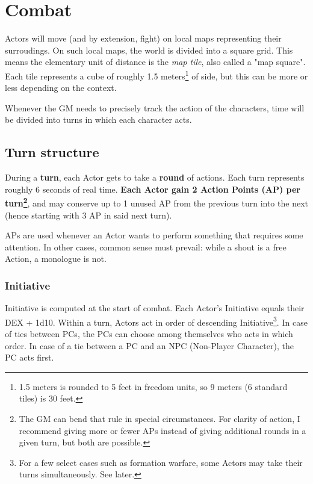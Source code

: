 \chapter{Combat}

Actors will move (and by extension, fight) on local maps representing their surroudings. On such local maps, the world is divided into a square grid. This means the elementary unit of distance is the \textit{map tile}, also called a "map square". Each tile represents a cube of roughly 1.5 meters\footnote{1.5 meters is rounded to 5 feet in freedom units, so 9 meters (6 standard tiles) is 30 feet.} of side, but this can be more or less depending on the context. 

Whenever the GM needs to precisely track the action of the characters, time will be divided into turns in which each character acts. 

\section{Turn structure}

During a \textbf{turn}, each Actor gets to take a \textbf{round} of actions. Each turn represents roughly 6 seconds of real time. \textbf{Each Actor gain 2 Action Points (AP) per turn\footnote{The GM can bend that rule in special circumstances. For clarity of action, I recommend giving more or fewer APs instead of giving additional rounds in a given turn, but both are possible.}}, and may conserve up to 1 unused AP from the previous turn into the next (hence starting with 3 AP in said next turn). 

APs are used whenever an Actor wants to perform something that requires some attention. In other cases, common sense must prevail: while a shout is a free Action, a monologue is not.

\subsection{Initiative} 

Initiative is computed at the start of combat. Each Actor's Initiative equals their DEX + 1d10. Within a turn, Actors act in order of descending Initiative\footnote{For a few select cases such as formation warfare, some Actors may take their turns simultaneously. See later.}. In case of ties between PCs, the PCs can choose among themselves who acts in which order. In case of a tie between a PC and an NPC (Non-Player Character), the PC acts first.

